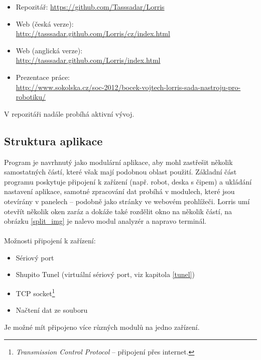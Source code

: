 \documentclass[12pt, a4paper, oneside]{article}
\newcommand{\It}{\textit}  %
\begin{document}
\begin{itemize}
    \item Repozitář: \url{https://github.com/Tasssadar/Lorris}
    \item Web (česká verze):\\ \url{http://tasssadar.github.com/Lorris/cz/index.html}
    \item Web (anglická verze):\\ \url{http://tasssadar.github.com/Lorris/index.html}
    \item Prezentace práce: \\ \url{http://www.sokolska.cz/soc-2012/bocek-vojtech-lorris-sada-nastroju-pro-robotiku/}
\end{itemize}
V repozitáři nadále probíhá aktivní vývoj.


\subsection{Struktura aplikace}
Program je navrhnutý jako modulární aplikace, aby mohl zastřešit několik samostatných částí, které však mají podobnou oblast použití. Základní část programu poskytuje připojení k zařízení (např. robot, deska s čipem) a ukládání nastavení aplikace, samotné zpracování dat probíhá v modulech, které jsou otevírány v panelech -- podobně jako stránky ve webovém prohlížeči. Lorris umí otevřít několik oken zaráz a dokáže také rozdělit okno na několik částí, na obrázku \ref{split_img} je nalevo modul analyzér a napravo terminál. \\
\\
\noindent Možnosti připojení k zařízení:
\begin{itemize}
    \item Sériový port
    \item Shupito Tunel (virtuální sériový port, viz kapitola \ref{tunel})
    \item TCP socket\footnote{\It{Transmission Control Protocol} -- připojení přes internet.}
    \item Načtení dat ze souboru
\end{itemize}
Je možné mít připojeno více různých modulů na jedno zařízení.  
\end{document}
